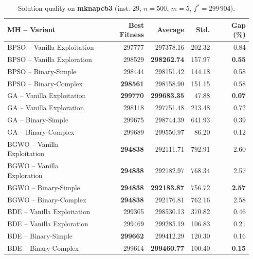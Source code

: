 \begin{table}[htbp]
  \centering
  \small
  \caption{Solution quality on \textbf{mknapcb3} (inst. 29, $n=500$, $m=5$, $f^*=299\,904$).}
  \label{tab:calidad_mknapcb3_29}
  \begin{tabular}{lrrrr}
    \toprule
    \textbf{MH -- Variant} &
    \textbf{Best Fitness} &
    \textbf{Average} &
    \textbf{Std.} &
    \textbf{Gap (\%)} \\
    \midrule
    BPSO -- Vanilla Exploitation &         297777 &        297378.16 & 202.32 &         0.84 \\
    BPSO -- Vanilla Exploration  &         298529 & \textbf{298262.74} & 157.97 & \textbf{0.55} \\
    BPSO -- Binary-Simple        &         298444 &        298151.42 & 144.18 &         0.58 \\
    BPSO -- Binary-Complex       & \textbf{298561} &        298158.90 & 151.15 &         0.58 \\
    \midrule
    GA -- Vanilla Exploitation   & \textbf{299770} & \textbf{299683.35} &  47.88 & \textbf{0.07} \\
    GA -- Vanilla Exploration    &         298118 &        297751.48 & 213.48 &         0.72 \\
    GA -- Binary-Simple          &         299675 &        298744.39 & 641.93 &         0.39 \\
    GA -- Binary-Complex         &         299689 &        299550.97 &  86.20 &         0.12 \\
    \midrule
    BGWO -- Vanilla Exploitation & \textbf{294838} &        292111.71 & 792.91 &         2.60 \\
    BGWO -- Vanilla Exploration  & \textbf{294838} &        292182.97 & 768.34 &         2.57 \\
    BGWO -- Binary-Simple        & \textbf{294838} & \textbf{292183.87} & 756.72 & \textbf{2.57} \\
    BGWO -- Binary-Complex       & \textbf{294838} &        292176.81 & 762.16 &         2.58 \\
    \midrule
    BDE -- Vanilla Exploitation  &         299305 &        298530.13 & 370.82 &         0.46 \\
    BDE -- Vanilla Exploration   &         299469 &        299285.19 & 106.83 &         0.21 \\
    BDE -- Binary-Simple         & \textbf{299662} &        299412.29 & 120.30 &         0.16 \\
    BDE -- Binary-Complex        &         299614 & \textbf{299460.77} & 100.40 & \textbf{0.15} \\
    \bottomrule
  \end{tabular}
\end{table}
